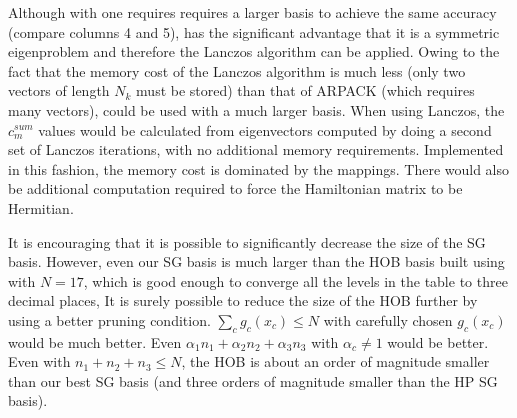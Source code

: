 Although with    one   requires  requires a larger basis to achieve the same accuracy      (compare columns 4 and 5), 
  has the significant advantage that it is a 
 symmetric eigenproblem and  therefore the Lanczos algorithm can be applied.  Owing to the fact that the memory cost of the 
 Lanczos algorithm is much less (only two vectors of length $N_k$ must be stored)    than that of ARPACK  (which requires many vectors),
  could be used with a much larger basis.  
% 
%
%
%
%
When using  Lanczos, the $c_m^{sum}$ values would   be calculated from eigenvectors computed   by doing  
a second set of Lanczos iterations,  \cite{Bramley1994b,Wang2003b}
 with no additional memory requirements.  Implemented in this fashion,   
 the   memory cost is dominated by    the mappings.  
There would also be additional computation required to force the Hamiltonian matrix  to be Hermitian.\cite{Cooper2009} 
%
%


%
 It is encouraging that it is possible to 
significantly decrease the size of the SG basis. 
%
  However, even our SG basis is much larger than  the    HOB basis built using 
  with $N=17$,   
which is  good enough to converge all the levels in the table to  three decimal places,        
%
It is surely possible to reduce the size of the HOB further by using a   better  pruning condition. $  \sum_c g_c(x_c) \le N$ with carefully chosen $g_c(x_c)$ would be much 
better.  Even 
$\alpha_1 n_1 +  \alpha_2 n_2 +  \alpha_3 n_3 $ with $\alpha_c \ne 1$ would be better.  Even with   $ n_1 +  n_2 +  n_3 \le N  $,  the HOB is about an order of magnitude 
smaller than our best SG basis (and three orders of magnitude smaller than the HP SG basis).
%



